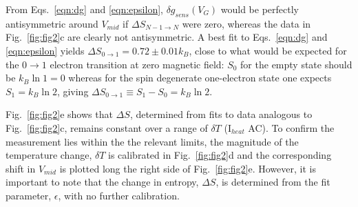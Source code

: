 \documentclass[twocolumn,showpacs,amsmath,amssymb,prl,aps,superscriptaddress]{revtex4-1}
\begin{document}
From Eqs.~\ref{eqn:dg} and \ref{eqn:epsilon}, $\delta g_{sens}(V_G)$ would be perfectly antisymmetric around $V_{mid}$ if $\Delta S_{N-1\rightarrow N}$ were zero, whereas the data in Fig.~\ref{fig:fig2}c are clearly not antisymmetric. A best fit to Eqs.~\ref{eqn:dg} and \ref{eqn:epsilon} yields $\Delta S_{0\rightarrow 1}=0.72 \pm 0.01 k_B$, close to what would be expected for the $0 \rightarrow 1$ electron transition at zero magnetic field: $S_0$ for the empty state should be $k_B \ln{1}=0$ whereas for the spin degenerate one-electron state one expects $S_1=k_B\ln{2}$, giving $\Delta S_{0\rightarrow 1}\equiv S_1 - S_0 =k_B\ln{2}$.

Fig.~\ref{fig:fig2}e shows that $\Delta S$,  determined from fits to data analogous to Fig.~\ref{fig:fig2}c, remains constant over a range of $\delta T$ (I$_{heat}$ AC).  To confirm the measurement lies within the the relevant limits, the magnitude of the temperature change, $\delta T$ is calibrated in Fig.~\ref{fig:fig2}d and the corresponding shift in $V_{mid}$ is plotted long the right side of Fig.~\ref{fig:fig2}e. However, it is important to note that the change in entropy, $\Delta S$, is determined from the fit parameter, $\epsilon$, with no further calibration. 
\end{document}
